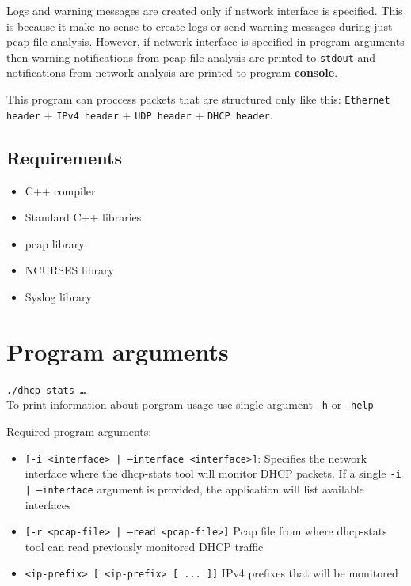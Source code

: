\documentclass[a4paper, 11pt, a4paper]{article}
\begin{document}
\bigskip

\noindent Logs and warning messages are created only if network interface is specified. This is because it make no sense to create logs or send warning messages
during just pcap file analysis. However, if network interface is specified in program arguments then warning notifications from pcap file analysis are 
printed to \texttt{stdout} and notifications from network analysis are printed to program \textbf{console}.

\bigskip

\noindent This program can proccess packets that are structured only like this:\newline
\texttt{Ethernet header} + \texttt{IPv4 header} + \texttt{UDP header} + \texttt{DHCP header}.


\subsection{Requirements}

\begin{itemize}
    \item C++ compiler
    \item Standard C++ libraries
    \item pcap library
    \item NCURSES library
    \item Syslog library
\end{itemize}


\section{Program arguments}

\texttt{./dhcp-stats \dots}\\


\noindent To print information about porgram usage use single argument \texttt{-h} or \texttt{---help}

\noindent Required program arguments:

\begin{itemize}
    \item \texttt{[-i <interface> | ---interface <interface>]}: Specifies the network interface where the dhcp-stats tool will monitor DHCP packets. If a single \texttt{-i | ---interface} argument is provided, the application will list available interfaces
    \item \texttt{[-r <pcap-file> | ---read <pcap-file>]} Pcap file from where dhcp-stats tool can read previously monitored DHCP traffic
    \item \texttt{<ip-prefix> [ <ip-prefix> [ ... ]]} IPv4 prefixes that will be monitored
\end{itemize}
\end{document}
